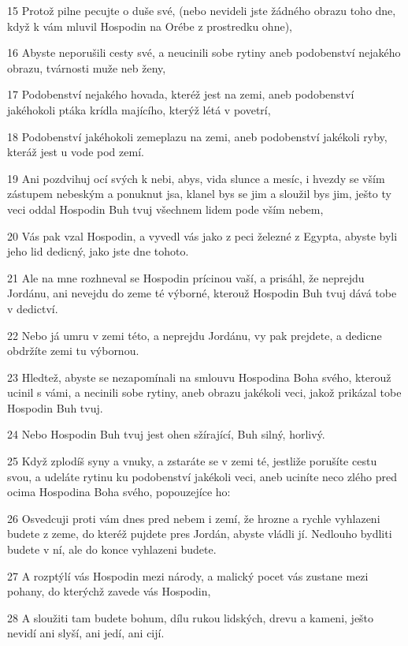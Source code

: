 \par 15 Protož pilne pecujte o duše své, (nebo nevideli jste žádného obrazu toho dne, když k vám mluvil Hospodin na Orébe z prostredku ohne),
\par 16 Abyste neporušili cesty své, a neucinili sobe rytiny aneb podobenství nejakého obrazu, tvárnosti muže neb ženy,
\par 17 Podobenství nejakého hovada, kteréž jest na zemi, aneb podobenství jakéhokoli ptáka krídla majícího, kterýž létá v povetrí,
\par 18 Podobenství jakéhokoli zemeplazu na zemi, aneb podobenství jakékoli ryby, kteráž jest u vode pod zemí.
\par 19 Ani pozdvihuj ocí svých k nebi, abys, vida slunce a mesíc, i hvezdy se vším zástupem nebeským a ponuknut jsa, klanel bys se jim a sloužil bys jim, ješto ty veci oddal Hospodin Buh tvuj všechnem lidem pode vším nebem,
\par 20 Vás pak vzal Hospodin, a vyvedl vás jako z peci železné z Egypta, abyste byli jeho lid dedicný, jako jste dne tohoto.
\par 21 Ale na mne rozhneval se Hospodin prícinou vaší, a prisáhl, že neprejdu Jordánu, ani nevejdu do zeme té výborné, kterouž Hospodin Buh tvuj dává tobe v dedictví.
\par 22 Nebo já umru v zemi této, a neprejdu Jordánu, vy pak prejdete, a dedicne obdržíte zemi tu výbornou.
\par 23 Hledtež, abyste se nezapomínali na smlouvu Hospodina Boha svého, kterouž ucinil s vámi, a necinili sobe rytiny, aneb obrazu jakékoli veci, jakož prikázal tobe Hospodin Buh tvuj.
\par 24 Nebo Hospodin Buh tvuj jest ohen sžírající, Buh silný, horlivý.
\par 25 Když zplodíš syny a vnuky, a zstaráte se v zemi té, jestliže porušíte cestu svou, a udeláte rytinu ku podobenství jakékoli veci, aneb uciníte neco zlého pred ocima Hospodina Boha svého, popouzejíce ho:
\par 26 Osvedcuji proti vám dnes pred nebem i zemí, že hrozne a rychle vyhlazeni budete z zeme, do kteréž pujdete pres Jordán, abyste vládli jí. Nedlouho bydliti budete v ní, ale do konce vyhlazeni budete.
\par 27 A rozptýlí vás Hospodin mezi národy, a malický pocet vás zustane mezi pohany, do kterýchž zavede vás Hospodin,
\par 28 A sloužiti tam budete bohum, dílu rukou lidských, drevu a kameni, ješto nevidí ani slyší, ani jedí, ani cijí.
